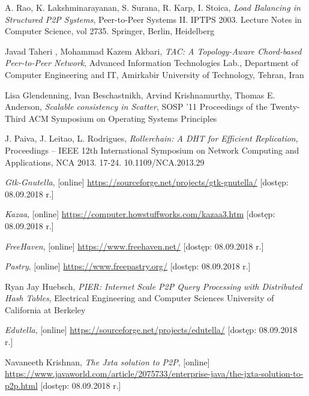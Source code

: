 \documentclass[12pt, twoside, openany]{report}
\begin{document}
\begin{thebibliography}{11}
 A. Rao, K. Lakshminarayanan, S. Surana, R. Karp, I. Stoica, \emph{Load Balancing in Structured P2P Systems}, Peer-to-Peer Systems II. IPTPS 2003. Lecture Notes in Computer Science, vol 2735. Springer, Berlin, Heidelberg

 Javad Taheri , Mohammad Kazem Akbari, \emph{TAC: A Topology-Aware Chord-based Peer-to-Peer Network}, Advanced Information Technologies Lab., Department of Computer Engineering and IT, Amirkabir University of Technology, Tehran, Iran

 Lisa Glendenning, Ivan Beschastnikh, Arvind Krishnamurthy, Thomas E. Anderson, \emph{Scalable consistency in Scatter}, SOSP '11 Proceedings of the Twenty-Third ACM Symposium on Operating Systems Principles

 J. Paiva, J. Leitao, L. Rodrigues, \emph{Rollerchain: A DHT for Efficient Replication}, Proceedings -- IEEE 12th International Symposium on Network Computing and Applications, NCA 2013. 17-24. 10.1109/NCA.2013.29

 \emph{Gtk-Gnutella}, [online] \url{https://sourceforge.net/projects/gtk-gnutella/} [dostęp: 08.09.2018 r.]

 \emph{Kazaa}, [online] \url{https://computer.howstuffworks.com/kazaa3.htm} [dostęp: 08.09.2018 r.]

 \emph{FreeHaven}, [online] \url{https://www.freehaven.net/} [dostęp: 08.09.2018 r.]

 \emph{Pastry}, [online] \url{https://www.freepastry.org/} [dostęp: 08.09.2018 r.]

 Ryan Jay Huebsch, \emph{PIER: Internet Scale P2P Query Processing with Distributed Hash Tables}, Electrical Engineering and Computer Sciences University of California at Berkeley

 \emph{Edutella}, [online] \url{https://sourceforge.net/projects/edutella/} [dostęp: 08.09.2018 r.]

 Navaneeth Krishnan, \emph{The Jxta solution to P2P}, [online] \url{https://www.javaworld.com/article/2075733/enterprise-java/the-jxta-solution-to-p2p.html} [dostęp: 08.09.2018 r.]


\end{thebibliography}
\end{document}
